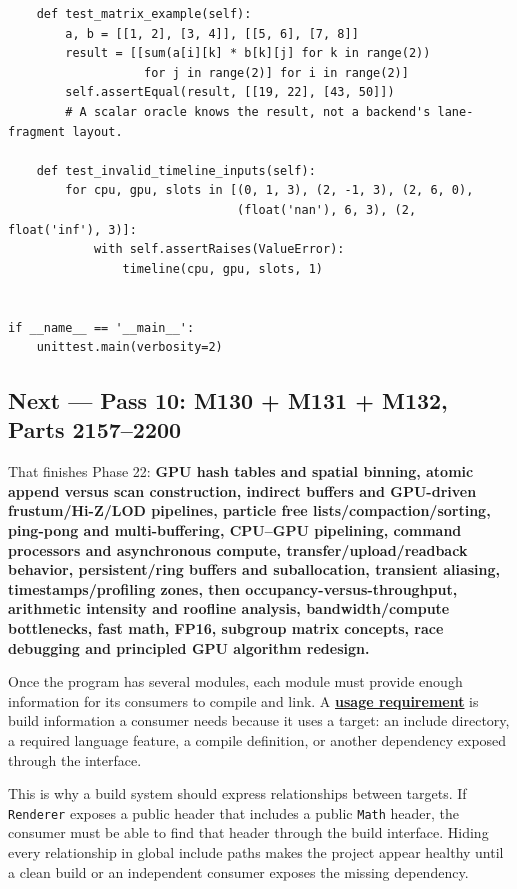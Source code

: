 \begin{verbatim}
    def test_matrix_example(self):
        a, b = [[1, 2], [3, 4]], [[5, 6], [7, 8]]
        result = [[sum(a[i][k] * b[k][j] for k in range(2))
                   for j in range(2)] for i in range(2)]
        self.assertEqual(result, [[19, 22], [43, 50]])
        # A scalar oracle knows the result, not a backend's lane-fragment layout.

    def test_invalid_timeline_inputs(self):
        for cpu, gpu, slots in [(0, 1, 3), (2, -1, 3), (2, 6, 0),
                                (float('nan'), 6, 3), (2, float('inf'), 3)]:
            with self.assertRaises(ValueError):
                timeline(cpu, gpu, slots, 1)


if __name__ == '__main__':
    unittest.main(verbosity=2)
\end{verbatim}

\subsection{Next --- Pass 10: M130 + M131 + M132, Parts 2157--2200}\label{03-visual-computing-i-ch016-next-pass-10-m130-m131-m132-parts-21572200}

That finishes Phase 22: \textbf{GPU hash tables and spatial binning, atomic append versus scan construction, indirect buffers and GPU-driven frustum/Hi-Z/LOD pipelines, particle free lists/compaction/sorting, ping-pong and multi-buffering, CPU--GPU pipelining, command processors and asynchronous compute, transfer/upload/readback behavior, persistent/ring buffers and suballocation, transient aliasing, timestamps/profiling zones, then occupancy-versus-throughput, arithmetic intensity and roofline analysis, bandwidth/compute bottlenecks, fast math, FP16, subgroup matrix concepts, race debugging and principled GPU algorithm redesign.}

Once the program has several modules, each module must provide enough information for its consumers to compile and link. A \textbf{\hyperref[appendix-3327b8977adf]{usage requirement}} is build information a consumer needs because it uses a target: an include directory, a required language feature, a compile definition, or another dependency exposed through the interface.

This is why a build system should express relationships between targets. If \texttt{Renderer} exposes a public header that includes a public \texttt{Math} header, the consumer must be able to find that header through the build interface. Hiding every relationship in global include paths makes the project appear healthy until a clean build or an independent consumer exposes the missing dependency.


